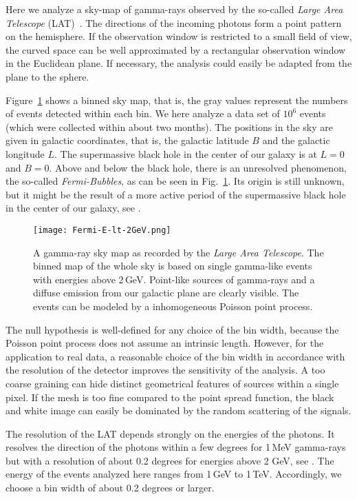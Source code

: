 \documentclass[12pt]{article}
\begin{document}
Here we analyze a sky-map of gamma-rays observed by the so-called {\em Large Area Telescope} (LAT)~\cite{0004-637X-697-2-1071}.
The directions of the incoming photons form a point pattern on the hemisphere.
If the observation window is restricted to a small field of view, the curved space can be well approximated by a rectangular observation window in the Euclidean plane.
%
If necessary, the analysis could easily be adapted from the plane to the sphere.

Figure~\ref{fig:Fermi-sky-map} shows a binned sky map, that is, the gray values represent the numbers of events detected within each bin.
%
We here analyze a data set of $10^6$ events (which were collected within about two months).
%
The positions in the sky are given in galactic coordinates, that is, the galactic latitude $B$ and the galactic longitude $L$.
The supermassive black hole in the center of our galaxy is at $L=0$ and $B=0$.
%
Above and below the black hole, there is an unresolved phenomenon, the so-called {\em Fermi-Bubbles}, as can be seen in Fig.~\ref{fig:Fermi-sky-map}.
%
Its origin is still unknown, but it might be the result of a more active period of the supermassive black hole in the center of our galaxy, see \cite{BordoloiEtAl2017}.


\begin{figure}[t]
  \centering
  \texttt{[image: Fermi-E-lt-2GeV.png]}
  \caption{A gamma-ray sky map as recorded by the {\em Large Area Telescope}.
     The binned map of the whole sky is based on single gamma-like events with energies above 2\,GeV.
  Point-like sources of gamma-rays and a diffuse emission from our galactic plane are clearly visible.
  The events can be modeled by a inhomogeneous Poisson point process.}
  \label{fig:Fermi-sky-map}
\end{figure}

The null hypothesis is well-defined for any choice of the bin width, because the Poisson point process does not assume an intrinsic length.
However, for the application to real data, a reasonable choice of the bin width in accordance with the resolution of the detector improves the sensitivity of the analysis.
%
A too coarse graining can hide distinct geometrical features of sources within a single pixel. If the mesh is too fine compared to the point spread function, the black and white image can easily be dominated by the random scattering of the signals.

The resolution of the LAT depends strongly on the energies of the photons. It resolves the direction of the photons within a few degrees for 1\,MeV gamma-rays  but with a resolution of about 0.2 degrees for energies above 2 GeV, see \cite{AceroEtAl2015}.
%
The energy of the events analyzed here ranges from 1\,GeV to 1\,TeV. Accordingly, we choose a bin width of about 0.2 degrees or larger.
\end{document}

